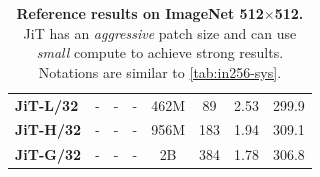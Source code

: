 \begin{table}[t]
\begin{tabular}{l | c c c | c c | c | c}
\headspace \textbf{JiT-L/32} & - & - & - & 462M & 89 & 2.53 & 299.9 \\
\headspace \textbf{JiT-H/32} & - & - & - & 956M & 183 & 1.94 & 309.1 \\
\headspace \textbf{JiT-G/32} & - & - & - & 2B & 384 & 1.78 & 306.8
\end{tabular}
\vspace{-.2em}
\caption{
\textbf{Reference results on ImageNet 512$\times$512.} JiT has an \textit{aggressive} patch size and can use \textit{small} compute to achieve strong results. Notations are similar to \cref{tab:in256-sys}.
}
\label{tab:in512-sys}
\vspace{-.5em}
\end{table}



